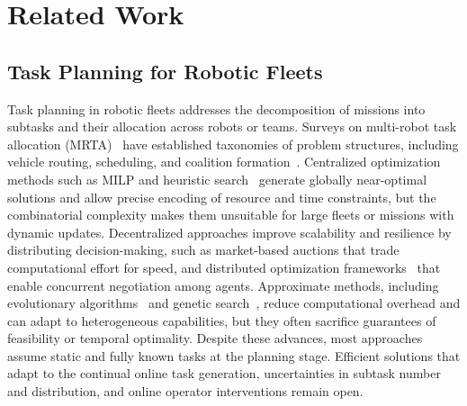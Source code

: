 \section{Related Work}\label{subsec:intro-related}

\subsection{Task Planning for Robotic Fleets}
Task planning in robotic fleets addresses the decomposition of missions into
subtasks and their allocation across robots or teams. Surveys on multi-robot
task allocation (MRTA)~\cite{gini2017multi, torreno2017cooperative}
have established taxonomies of problem structures, including vehicle routing,
scheduling, and coalition formation~\cite{dai2024dynamic}.
Centralized optimization methods such as MILP and heuristic
search~\cite{ji2021multi} generate globally near-optimal
solutions and allow precise encoding of resource and time constraints, but the
combinatorial complexity makes them unsuitable for large fleets or missions with
dynamic updates. Decentralized approaches improve scalability and resilience by
distributing decision-making, such as market-based auctions
\cite{zhao2021market} that trade computational effort for speed, and distributed
optimization frameworks~\cite{fioretto2018distributed} that enable concurrent
negotiation among agents. Approximate methods, including evolutionary
algorithms~\cite{liu2019multi} and genetic search~\cite{martin2021mrta}, reduce
computational overhead and can adapt to heterogeneous capabilities, but they
often sacrifice guarantees of feasibility or temporal optimality.
Despite these advances, most approaches assume static and fully known tasks at the planning
stage. Efficient solutions that adapt to the continual online task generation,
uncertainties in subtask number and distribution,
and online operator interventions remain open.


